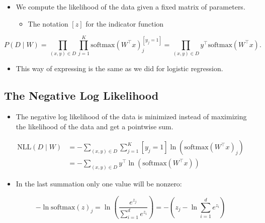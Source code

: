 \documentclass[11pt]{article}
\begin{document}
\begin{itemize}
\item We compute the likelihood of the data given a fixed matrix of parameters.
\begin{itemize}
\item The notation \([z]\) for the indicator function
\end{itemize}
\end{itemize}
$$
P(D \mid W) =
\prod_{(x,y)\in D}
\prod_{j=1}^K
\textrm{softmax}(W^\intercal x)_j^{[y_j=1]}
=
\prod_{(x,y)\in D}
y^\intercal
\textrm{softmax}(W^\intercal x)
.
$$

\begin{itemize}
\item This way of expressing is the same as we did for logistic regression.
\end{itemize}

\subsection{The Negative Log Likelihood}
\label{sec:org8691ae0}
\begin{itemize}
\item The negative log likelihood of the data is minimized instead of maximizing the likelihood of the data and get a pointwise sum.
\end{itemize}
\begin{align}\textrm{NLL}(D\mid W) &=
-\sum_{(x,y)\in D}
\sum_{j=1}^K
[y_j=1]
\ln (\textrm{softmax}(W^\intercal x)_j)
\\
&=-\sum_{(x,y)\in D}
y^\intercal
\ln (\textrm{softmax}(W^\intercal x))
\end{align}


\begin{itemize}
\item In the last summation only one value will be nonzero:
\end{itemize}
\begin{equation}
  - \ln \textrm{softmax}(z)_j = \ln \left( \frac{e^{z_j}}{\sum_{i=1}^d e^{z_i}}\right) = - (z_j - \ln \sum_{i=1}^d e^{z_i})
\end{equation}
\end{document}
